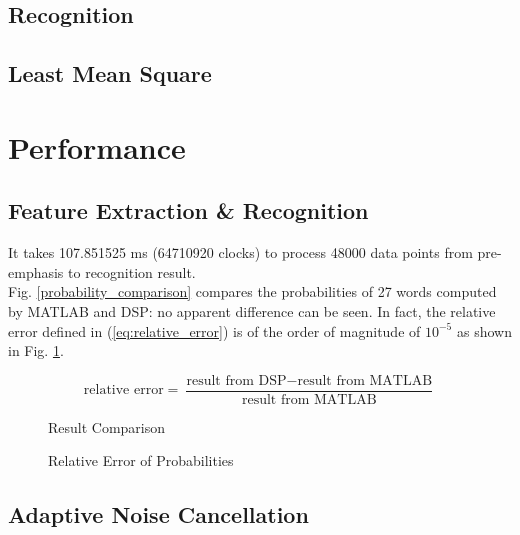 
\subsection{Recognition}


\subsection{Least Mean Square}


\section{Performance}

\subsection{Feature Extraction \& Recognition}

It takes 107.851525 ms (64710920 clocks) to process 48000 data points from pre-emphasis to recognition result.\\

Fig. \ref{probability_comparison} compares the probabilities of 27 words computed by MATLAB and DSP: no apparent difference can be seen. In fact, the relative error defined in (\ref{eq:relative_error}) is of the order of magnitude of $10^{-5}$ as shown in Fig. \ref{probability_error}.

\begin{equation}
\label{eq:relative_error}
\text{relative error} = \frac{\text{result from DSP} - \text{result from MATLAB}}{\text{result from MATLAB}}
\end{equation}

\begin{figure}[H]
\begin{minipage}[t]{0.5\linewidth}
\centering
{}
\caption{Result Comparison}
\label{probability_comparison}
\end{minipage}
\begin{minipage}[t]{0.5\linewidth}
\centering
{}
\caption{Relative Error of Probabilities}
\label{probability_error}
\end{minipage}
\end{figure}


\subsection{Adaptive Noise Cancellation}
